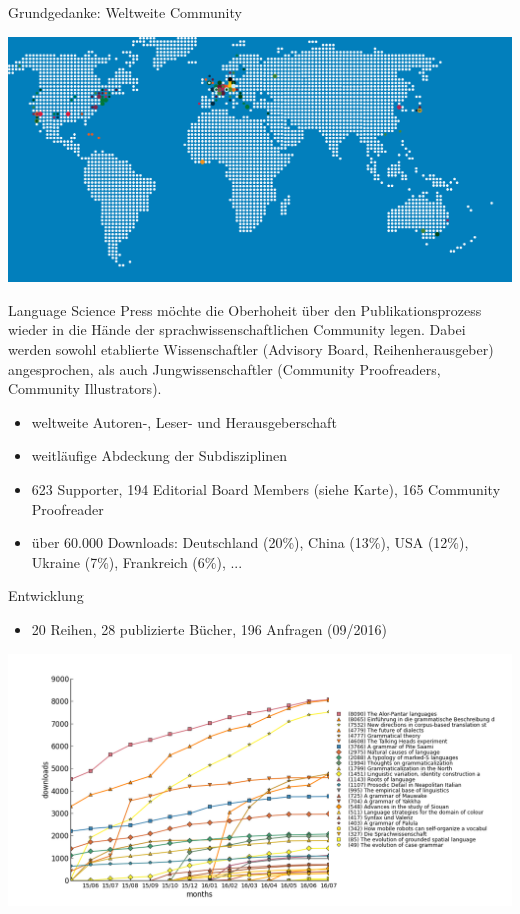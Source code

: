 \documentclass[final,utf8]{beamer}
\begin{document}
\begin{frame}{}
\begin{columns}[t]
\begin{column}{.45\linewidth}
    \begin{block}{Grundgedanke: Weltweite Community} 
	\parbox{.9\textwidth}{
\includegraphics[width=.9\textwidth]{WORLDMAPDOTSdots.png}


Language Science Press m\"ochte die Oberhoheit \"uber den Publikationsprozess wieder in die H\"ande der sprachwissenschaftlichen Community legen. Dabei werden sowohl etablierte Wissenschaftler (Advisory Board, Reihenherausgeber) angesprochen, als auch Jungwissenschaftler (Community Proofreaders, Community Illustrators).  

	\begin{itemize} 
	    \item weltweite Autoren-, Leser- und Herausgeberschaft
	    \item weitl\"aufige Abdeckung der Subdisziplinen
	    \item 623 Supporter, 194 Editorial Board Members (siehe Karte), 165 Community Proofreader
	    \item \"uber 60.000 Downloads: Deutschland (20\%), China (13\%), USA (12\%), Ukraine (7\%), Frankreich (6\%), ...
	\end{itemize}  
}
    \end{block} 

    \begin{block}{Entwicklung}
	  \begin{itemize}
		      \item 20 Reihen, 28 publizierte B\"ucher, 196 Anfragen (09/2016)
	  \end{itemize} 
      \includegraphics[width=.9\textwidth]{cumulativeall.png}
    \end{block}  
  


\end{column}
\end{columns}
\end{frame}
\end{document}
